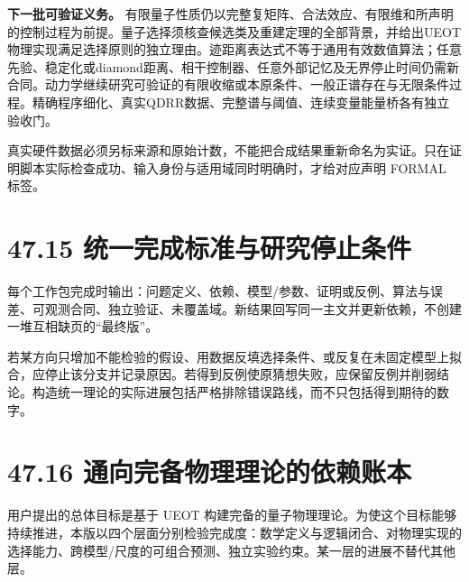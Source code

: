 \documentclass[
  11pt,
  oneside]{book}
\begin{document}
\textbf{下一批可验证义务。}
有限量子性质仍以完整复矩阵、合法效应、有限维和所声明的控制过程为前提。量子选择须核查候选类及重建定理的全部背景，并给出UEOT物理实现满足选择原则的独立理由。迹距离表达式不等于通用有效数值算法；任意先验、稳定化或diamond距离、相干控制器、任意外部记忆及无界停止时间仍需新合同。动力学继续研究可验证的有限收缩或本原条件、一般正谱存在与无限条件过程。精确程序细化、真实QDRR数据、完整谱与阈值、连续变量能量桥各有独立验收门。

真实硬件数据必须另标来源和原始计数，不能把合成结果重新命名为实证。只在证明脚本实际检查成功、输入身份与适用域同时明确时，才给对应声明
FORMAL 标签。

\section{47.15 统一完成标准与研究停止条件}

每个工作包完成时输出：问题定义、依赖、模型/参数、证明或反例、算法与误差、可观测合同、独立验证、未覆盖域。新结果回写同一主文并更新依赖，不创建一堆互相缺页的``最终版''。

若某方向只增加不能检验的假设、用数据反填选择条件、或反复在未固定模型上拟合，应停止该分支并记录原因。若得到反例使原猜想失败，应保留反例并削弱结论。构造统一理论的实际进展包括严格排除错误路线，而不只包括得到期待的数字。

\section{47.16 通向完备物理理论的依赖账本}

用户提出的总体目标是基于 UEOT
构建完备的量子物理理论。为使这个目标能够持续推进，本版以四个层面分别检验完成度：数学定义与逻辑闭合、对物理实现的选择能力、跨模型/尺度的可组合预测、独立实验约束。某一层的进展不替代其他层。
\end{document}
